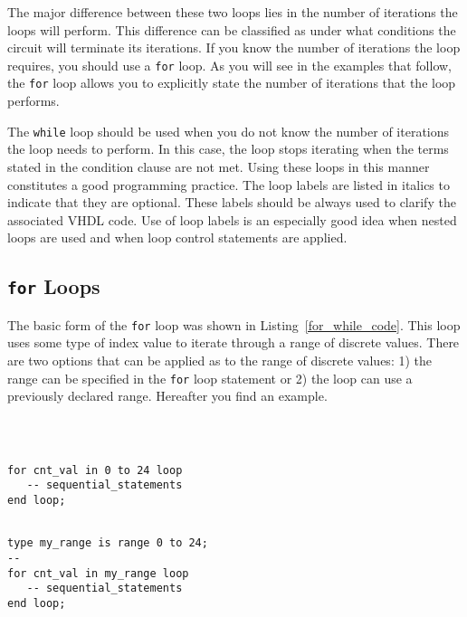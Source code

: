 The major difference between these two loops lies in the number of iterations the loops will perform. This difference can be classified as under what conditions the circuit will terminate its iterations. If you know the number of iterations the loop requires, you should use a \texttt{for} loop. As you will see in the examples that follow, the \texttt{for} loop allows you to explicitly state the number of iterations that the loop performs.

The \texttt{while} loop should be used when you do not know the number of iterations the loop needs to perform. In this case, the loop stops iterating when the terms stated in the condition clause are not met. Using these loops in this manner constitutes a good programming practice. The loop labels are listed in italics to indicate that they are optional. These labels should be always used to clarify the associated VHDL code. Use of loop labels is an especially good idea when nested loops are used and when loop control statements are applied.

\subsection{\texttt{for} Loops}
The basic form of the \texttt{for} loop was shown in Listing~\ref{for_while_code}. This loop uses some type of index value to iterate through a range of discrete values. There are two options that can be applied as to the range of discrete values: 1) the range can be specified in the \texttt{for} loop statement or 2) the loop can use a previously declared range. Hereafter you find  an example.

\vspace{10pt}
\noindent
\begin{minipage}{0.49\linewidth}
\begin{lstlisting}



for cnt_val in 0 to 24 loop
   -- sequential_statements
end loop;
\end{lstlisting}
\end{minipage}
\begin{minipage}{0.5\linewidth}
\begin{lstlisting}

type my_range is range 0 to 24;
--
for cnt_val in my_range loop
   -- sequential_statements
end loop;
\end{lstlisting}
\end{minipage}

